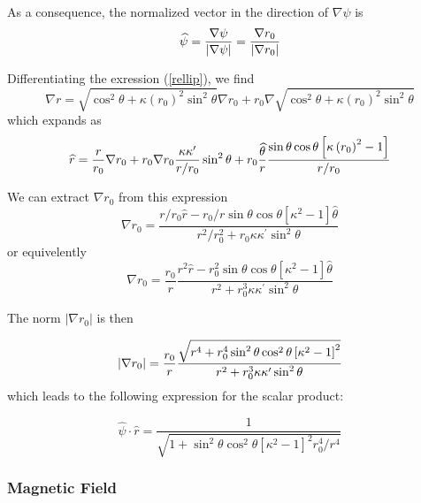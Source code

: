 \documentclass{article}
\begin{document}
As a consequence, the normalized vector in the direction of $\nabla \psi $ is
\begin{equation}
\widehat{\psi }=\frac{\nabla \psi }{\left| \nabla \psi \right| }=\frac{%
\nabla r_{0}}{\left| \nabla r_{0}\right| }
\end{equation}

Differentiating the exression (\ref{rellip}), we find
\begin{equation}
\nabla r=\sqrt{\cos ^{2}\theta +\kappa \left( r_{0}\right) ^{2}\sin
^{2}\theta }\nabla r_{0}+r_{0}\nabla \sqrt{\cos ^{2}\theta +\kappa \left(
r_{0}\right) ^{2}\sin ^{2}\theta }
\end{equation}
which expands as
\begin{equation}
\widehat{r}=\frac{r}{r_{0}}\nabla r_{0}+r_{0}\nabla r_{0}\frac{\kappa \kappa
^{\prime }}{r/r_{0}}\sin ^{2}\theta +r_{0}\frac{\widehat{\theta }}{r}\frac{%
\sin \theta \cos \theta \left[ \kappa \left( r_{0}\right) ^{2}-1\right] }{%
r/r_{0}}
\end{equation}

We can extract $\nabla r_{0}$ from this expression
\begin{equation}
\nabla r_{0}=\frac{r/r_{0}\widehat{r}-r_{0}/r\sin \theta \cos \theta \left[
\kappa ^{2}-1\right] \widehat{\theta }}{r^{2}/r_{0}^{2}+r_{0}\kappa \kappa
^{\prime }\sin ^{2}\theta }
\end{equation}
or equivelently
\begin{equation}
\nabla r_{0}=\frac{r_{0}}{r}\frac{r^{2}\widehat{r}-r_{0}^{2}\sin \theta \cos
\theta \left[ \kappa ^{2}-1\right] \widehat{\theta }}{r^{2}+r_{0}^{3}\kappa
\kappa ^{\prime }\sin ^{2}\theta }
\end{equation}

The norm $\left| \nabla r_{0}\right| $ is then

\begin{equation}
\left| \nabla r_{0}\right| =\frac{r_{0}}{r}\frac{\sqrt{r^{4}+r_{0}^{4}\sin
^{2}\theta \cos ^{2}\theta \left[ \kappa ^{2}-1\right] ^{2}}}{%
r^{2}+r_{0}^{3}\kappa \kappa ^{\prime }\sin ^{2}\theta }
\end{equation}
which leads to the following expression for the scalar product:

\begin{equation}
\widehat{\psi }\cdot \widehat{r}=\frac{1}{\sqrt{1+\sin ^{2}\theta \cos
^{2}\theta \left[ \kappa ^{2}-1\right] ^{2}r_{0}^{4}/r^{4}}}
\end{equation}

\subsubsection{Magnetic Field}
\end{document}
